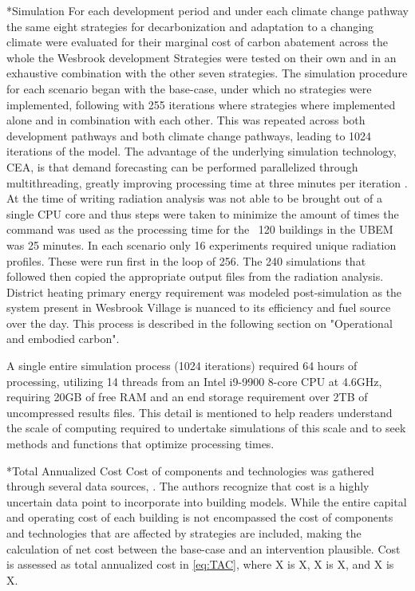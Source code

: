 \documentclass[twocolumn, a4paper,10pt]{article}
\makeatletter
\renewcommand\subsection{\@startsection{subsection}{1}{\z@}{\z@}{\z@}{\normalfont\normalsize\bfseries}}
\renewcommand\subsection{\@startsection{subsection}{1}{\z@}{\z@}{0.1pt}{\normalfont\normalsize\bfseries}}
\makeatother
\begin{document}
\subsection*{Simulation}
For each development period and under each climate change pathway the same eight strategies for decarbonization and adaptation to a changing climate were evaluated for their marginal cost of carbon abatement across the whole the Wesbrook development Strategies were tested on their own and in an exhaustive combination with the other seven strategies. The simulation procedure for each scenario began with the base-case, under which no strategies were implemented, following with 255 iterations where strategies where implemented alone and in combination with each other. This was repeated across both development pathways and both climate change pathways, leading to 1024 iterations of the model. The advantage of the underlying simulation technology, CEA, is that demand forecasting can be performed parallelized through multithreading, greatly improving processing time at three minutes per iteration \citep{multithreading package}. At the time of writing radiation analysis was not able to be brought out of a single CPU core and thus steps were taken to minimize the amount of times the command was used as the processing time for the ~120 buildings in the UBEM was 25 minutes. In each scenario only 16 experiments required unique radiation profiles. These were run first in the loop of 256. The 240 simulations that followed then copied the appropriate output files from the radiation analysis. District heating primary energy requirement was modeled post-simulation as the system present in Wesbrook Village is nuanced to its efficiency and fuel source over the day. This process is described in the following section on "Operational and embodied carbon". 

A single entire simulation process (1024 iterations) required 64 hours of processing, utilizing 14 threads from an Intel i9-9900 8-core CPU at 4.6GHz, requiring 20GB of free RAM and an end storage requirement over 2TB of uncompressed results files. This detail is mentioned to help readers understand the scale of computing required to undertake simulations of this scale and to seek methods and functions that optimize processing times. 

\subsection*{Total Annualized Cost}
Cost of components and technologies was gathered through several data sources, \citep{data sources for cost}. The authors recognize that cost is a highly uncertain data point to incorporate into building models. While the entire capital and operating cost of each building is not encompassed the cost of components and technologies that are affected by strategies are included, making the calculation of net cost between the base-case and an intervention plausible. Cost is assessed as total annualized cost in \ref{eq:TAC}, where X is X, X is X, and X is X.
\end{document}
